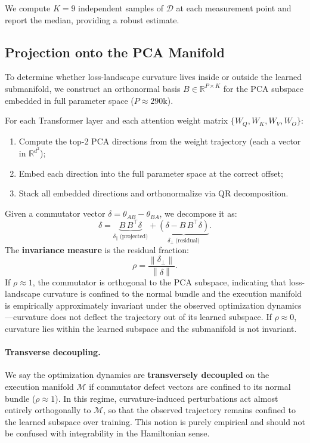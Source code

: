 \documentclass[11pt]{article}
\newcommand{\R}{\mathbb{R}}
\newcommand{\norm}[1]{\left\|#1\right\|}
\newcommand{\defect}{\mathcal{D}}
\begin{document}
We compute $K = 9$ independent samples of $\defect$ at each measurement point and report the median, providing a robust estimate.

\subsection{Projection onto the PCA Manifold}
\label{sec:projection}

To determine whether loss-landscape curvature lives inside or outside the learned submanifold, we construct an orthonormal basis $B \in \R^{P \times K}$ for the PCA subspace embedded in full parameter space ($P \approx 290$k).

For each Transformer layer and each attention weight matrix $\{W_Q, W_K, W_V, W_O\}$:
\begin{enumerate}
    \item Compute the top-2 PCA directions from the weight trajectory (each a vector in $\R^{d^2}$);
    \item Embed each direction into the full parameter space at the correct offset;
    \item Stack all embedded directions and orthonormalize via QR decomposition.
\end{enumerate}

Given a commutator vector $\delta = \theta_{AB} - \theta_{BA}$, we decompose it as:
\begin{equation}
    \delta = \underbrace{B\, B^\top \delta}_{\delta_\parallel\;\text{(projected)}} + \underbrace{(\delta - B\, B^\top \delta)}_{\delta_\perp\;\text{(residual)}}.
\end{equation}
The \textbf{invariance measure} is the residual fraction:
\begin{equation}
\label{eq:invariance}
    \rho = \frac{\norm{\delta_\perp}}{\norm{\delta}}.
\end{equation}
If $\rho \approx 1$, the commutator is orthogonal to the PCA subspace, indicating that loss-landscape curvature is confined to the normal bundle and the execution manifold is empirically approximately invariant under the observed optimization dynamics---curvature does not deflect the trajectory out of its learned subspace.
If $\rho \approx 0$, curvature lies within the learned subspace and the submanifold is not invariant.

\paragraph{Transverse decoupling.}
We say the optimization dynamics are \textbf{transversely decoupled} on the execution manifold $\mathcal{M}$ if commutator defect vectors are confined to its normal bundle ($\rho \approx 1$).
In this regime, curvature-induced perturbations act almost entirely orthogonally to $\mathcal{M}$, so that the observed trajectory remains confined to the learned subspace over training.
This notion is purely empirical and should not be confused with integrability in the Hamiltonian sense.
\end{document}
